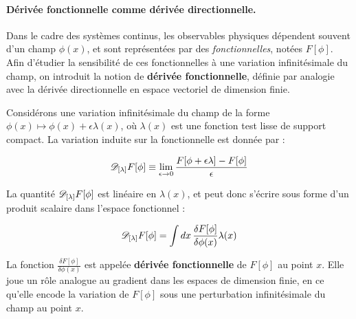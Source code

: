 %
\paragraph{Dérivée fonctionnelle comme dérivée directionnelle.}

Dans le cadre des systèmes continus, les observables physiques dépendent souvent d'un champ $\phi(x)$, et sont représentées par des \emph{fonctionnelles}, notées $F[\phi]$. Afin d'étudier la sensibilité de ces fonctionnelles à une variation infinitésimale du champ, on introduit la notion de \textbf{dérivée fonctionnelle}, définie par analogie avec la dérivée directionnelle en espace vectoriel de dimension finie.

Considérons une variation infinitésimale du champ de la forme $\phi(x) \mapsto \phi(x) + \epsilon \lambda(x)$, où $\lambda(x)$ est une fonction test lisse de support compact. La variation induite sur la fonctionnelle est donnée par :

\begin{equation}\label{chap2:eq.diff.q.1}
	\mathscr{D}_{[\lambda]} F[\phi] \equiv \lim_{\epsilon \to 0} \frac{F[\phi + \epsilon \lambda] - F[\phi]}{\epsilon}
\end{equation}

La quantité $\mathscr{D}_{[\lambda]} F[\phi]$ est linéaire en $\lambda(x)$, et peut donc s’écrire sous forme d’un produit scalaire dans l’espace fonctionnel :

\begin{equation}\label{chap2:eq.diff.q.2}
	\mathscr{D}_{[\lambda]} F[\phi] = \int dx \, \frac{\delta F[\phi]}{\delta \phi(x)} \lambda(x)
\end{equation}

La fonction $\frac{\delta F[\phi]}{\delta \phi(x)}$ est appelée \textbf{dérivée fonctionnelle} de $F[\phi]$ au point $x$. Elle joue un rôle analogue au gradient dans les espaces de dimension finie, en ce qu’elle encode la variation de $F[\phi]$ sous une perturbation infinitésimale du champ au point $x$.

